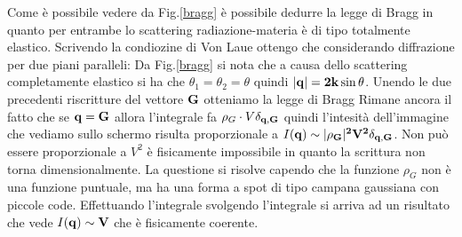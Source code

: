 \documentclass[a4paper,12pt]{article}
\begin{document}
Come è possibile vedere da Fig.\ref{bragg} è possibile dedurre la legge di Bragg in quanto per entrambe lo scattering radiazione-materia è di tipo totalmente elastico. Scrivendo la condiozine di Von Laue ottengo che
considerando diffrazione per due piani paralleli:
Da Fig.\ref{bragg} si nota che a causa dello scattering completamente elastico si ha che $\theta_1 = \theta_2 = \theta$ quindi  $|\it\bf{q} | = 2k\sin\theta$. Unendo le due precedenti riscritture del vettore $\it\bf{G}$ otteniamo la legge di Bragg
Rimane ancora il fatto che se $\it\bf{q}=\it\bf{G}$ allora l'integrale fa $\rho_G \cdot V \delta_{\it\bf{q},\it\bf{G}} $ quindi l'intesità dell'immagine che vediamo sullo schermo risulta proporzionale a $I(\it\bf{q}) \sim |\rho_G|^2 V^2 \delta_{\it\bf{q},\it\bf{G}}$. Non può essere proporzionale a $V^2$ è fisicamente impossibile in quanto la scrittura non torna dimensionalmente. La questione si risolve capendo che la funzione $\rho_G$ non è una funzione puntuale, ma ha una forma a spot di tipo campana gaussiana con piccole code. Effettuando l'integrale
svolgendo l'integrale si arriva ad un risultato che vede $I(\it\bf{q})\sim V$ che è fisicamente coerente.
\end{document}
